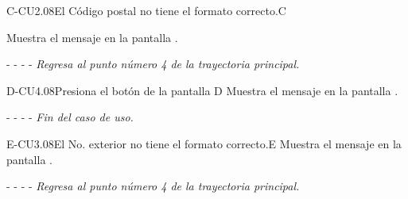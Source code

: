 		\begin{UCtrayectoriaA}{C-CU2.08}{El Código postal no tiene el formato correcto.}{C}

			\UCpaso[\UCsist] Muestra el mensaje  en la pantalla .
			\item[- -] - - {\em Regresa al punto número 4 de la trayectoria principal.} 
    \end{UCtrayectoriaA}

    
	\begin{UCtrayectoriaA}{D-CU4.08}{Presiona el botón  de la pantalla }{D}
		\UCpaso[\UCsist] Muestra el mensaje  en la pantalla .
		\item[- -] - - {\em Fin del caso de uso.} 
	\end{UCtrayectoriaA}
    
    
    \begin{UCtrayectoriaA}{E-CU3.08}{El No. exterior no tiene el formato correcto.}{E}
			\UCpaso[\UCsist] Muestra el mensaje  en la pantalla .
			\item[- -] - - {\em Regresa al punto número 4 de la trayectoria principal.} 
    \end{UCtrayectoriaA}

